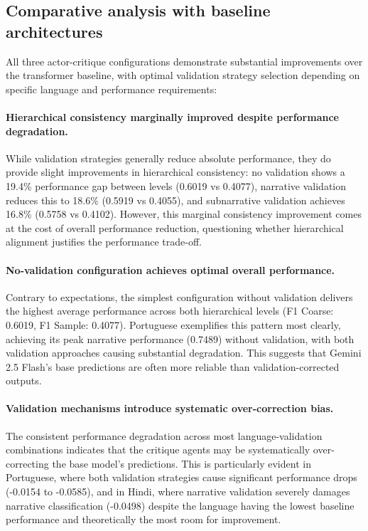\subsection{Comparative analysis with baseline architectures}

All three actor-critique configurations demonstrate substantial improvements over the transformer baseline, with optimal validation strategy selection depending on specific language and performance requirements:

\paragraph{Hierarchical consistency marginally improved despite performance degradation.} While validation strategies generally reduce absolute performance, they do provide slight improvements in hierarchical consistency: no validation shows a 19.4\% performance gap between levels (0.6019 vs 0.4077), narrative validation reduces this to 18.6\% (0.5919 vs 0.4055), and subnarrative validation achieves 16.8\% (0.5758 vs 0.4102). However, this marginal consistency improvement comes at the cost of overall performance reduction, questioning whether hierarchical alignment justifies the performance trade-off.

\paragraph{No-validation configuration achieves optimal overall performance.} Contrary to expectations, the simplest configuration without validation delivers the highest average performance across both hierarchical levels (F1 Coarse: 0.6019, F1 Sample: 0.4077). Portuguese exemplifies this pattern most clearly, achieving its peak narrative performance (0.7489) without validation, with both validation approaches causing substantial degradation. This suggests that Gemini 2.5 Flash's base predictions are often more reliable than validation-corrected outputs.

\paragraph{Validation mechanisms introduce systematic over-correction bias.} The consistent performance degradation across most language-validation combinations indicates that the critique agents may be systematically over-correcting the base model's predictions. This is particularly evident in Portuguese, where both validation strategies cause significant performance drops (-0.0154 to -0.0585), and in Hindi, where narrative validation severely damages narrative classification (-0.0498) despite the language having the lowest baseline performance and theoretically the most room for improvement.

